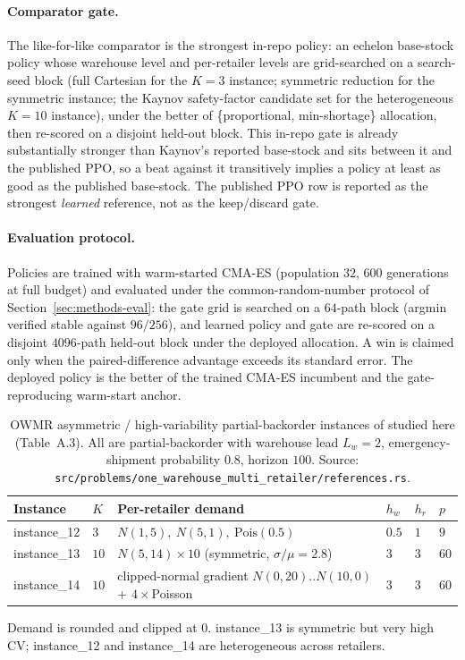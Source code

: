 \paragraph{Comparator gate.}
The like-for-like comparator is the strongest in-repo policy: an echelon base-stock policy whose
warehouse level and per-retailer levels are grid-searched on a search-seed block (full Cartesian for
the $K{=}3$ instance; symmetric reduction for the symmetric instance; the Kaynov safety-factor
candidate set for the heterogeneous $K{=}10$ instance), under the better of \{proportional,
min-shortage\} allocation, then re-scored on a disjoint held-out block. This in-repo gate is already
substantially stronger than Kaynov's reported base-stock and sits between it and the published PPO,
so a beat against it transitively implies a policy at least as good as the published base-stock. The
published PPO row is reported as the strongest \emph{learned} reference, not as the keep/discard gate.

\paragraph{Evaluation protocol.}
Policies are trained with warm-started CMA-ES (population $32$, $600$ generations at full budget) and
evaluated under the common-random-number protocol of Section~\ref{sec:methods-eval}: the gate grid is
searched on a $64$-path block (argmin verified stable against $96/256$), and learned policy and gate
are re-scored on a disjoint $4096$-path held-out block under the deployed allocation. A win is claimed
only when the paired-difference advantage exceeds its standard error. The deployed policy is the
better of the trained CMA-ES incumbent and the gate-reproducing warm-start anchor.

\begin{table}[!htbp]
\centering
\small
\caption{OWMR asymmetric / high-variability partial-backorder instances of \citet{kaynov2024owmr}
studied here (Table~A.3). All are partial-backorder with warehouse lead $L_w=2$, emergency-shipment
probability $0.8$, horizon $100$. Source:
\texttt{src/problems/one\_warehouse\_multi\_retailer/references.rs}.}
\label{tab:owmr-params}
\begin{tabular}{llllll}
\toprule
Instance & $K$ & Per-retailer demand & $h_w$ & $h_r$ & $p$ \\
\midrule
instance\_12 & $3$  & $N(1,5),\ N(5,1),\ \mathrm{Pois}(0.5)$ & $0.5$ & $1$ & $9$ \\
instance\_13 & $10$ & $N(5,14)\times 10$ (symmetric, $\sigma/\mu=2.8$) & $3$ & $3$ & $60$ \\
instance\_14 & $10$ & clipped-normal gradient $N(0,20)..N(10,0)$ + $4\times$Poisson & $3$ & $3$ & $60$ \\
\bottomrule
\end{tabular}
\par\medskip\footnotesize Demand is rounded and clipped at $0$. instance\_13 is symmetric but very
high CV; instance\_12 and instance\_14 are heterogeneous across retailers.
\end{table}
\FloatBarrier

